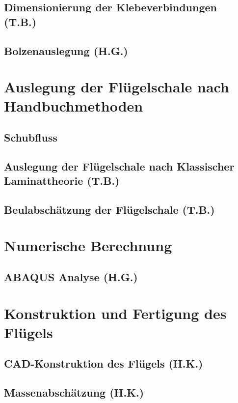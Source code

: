 \documentclass[a4paper,oneside,11pt]{article}
\begin{document}
\subsection{Dimensionierung der Klebeverbindungen (T.B.)}

\newpage
\subsection{Bolzenauslegung (H.G.)}

\newpage
\section{Auslegung der Flügelschale nach Handbuchmethoden}
\subsection{Schubfluss}

\newpage
\subsection{Auslegung der Flügelschale nach Klassischer Laminattheorie (T.B.)}

\newpage
\subsection{Beulabschätzung der Flügelschale (T.B.)}

\newpage
\section{Numerische Berechnung}\label{FEM}

\newpage
\subsection{ABAQUS Analyse (H.G.)}

\newpage
\section{Konstruktion und Fertigung des Flügels}
\subsection{CAD-Konstruktion des Flügels (H.K.)}\label{CAD}

\newpage
\subsection{Massenabschätzung (H.K.)}

\newpage
\end{document}

